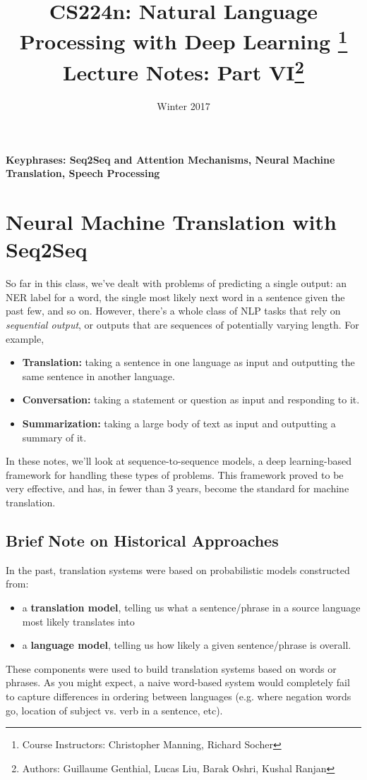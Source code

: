 \documentclass{tufte-handout}
\title{CS224n: Natural Language Processing with Deep Learning
       \thanks{Course Instructors: Christopher Manning, Richard Socher} \\
       \Large Lecture Notes: Part VI\thanks{Authors: Guillaume Genthial, Lucas Liu, Barak Oshri, Kushal Ranjan}}
\date{Winter 2017} %
\begin{document}
\maketitle%


\textbf{Keyphrases: Seq2Seq and Attention Mechanisms, Neural Machine Translation, Speech Processing}
\section{Neural Machine Translation with Seq2Seq}
So far in this class, we've dealt with problems of predicting a single output: an NER label for a word, the single most likely next word in a sentence given the past few, and so on. However, there's a whole class of NLP tasks that rely on \textit{sequential output}, or outputs that are sequences of potentially varying length. For example,
\begin{itemize}
\item \textbf{Translation:} taking a sentence in one language as input and outputting the same sentence in another language.
\item \textbf{Conversation:} taking a statement or question as input and responding to it.
\item \textbf{Summarization:} taking a large body of text as input and outputting a summary of it.
\end{itemize}
In these notes, we'll look at sequence-to-sequence models, a deep learning-based framework for handling these types of problems. This framework proved to be very effective, and has, in fewer than 3 years, become the standard for machine translation.

\subsection{Brief Note on Historical Approaches}
In the past, translation systems were based on probabilistic models constructed from:
\begin{itemize}
\item a \textbf{translation model}, telling us what a sentence/phrase in a source language most likely translates into
\item a \textbf{language model}, telling us how likely a given sentence/phrase is overall.
\end{itemize}
These components were used to build translation systems based on words or phrases. As you might expect, a naive word-based system would completely fail to capture differences in ordering between languages (e.g. where negation words go, location of subject vs. verb in a sentence, etc).
\end{document}
